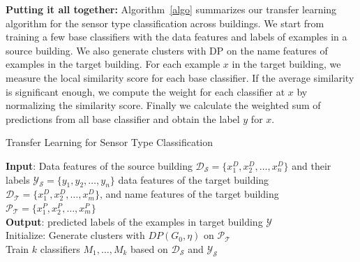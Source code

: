 {\bf Putting it all together:} Algorithm~\ref{algo} summarizes our transfer learning algorithm for the sensor type classification across buildings. We start from training a few base classifiers with the data features and labels of examples in a source building. We also generate clusters with DP on the name features of examples in the target building. For each example $x$ in the target building, we measure the local similarity score for each base classifier. If the average similarity is significant enough, we compute the weight for each classifier at $x$ by normalizing the similarity score. Finally we calculate the weighted sum of predictions from all base classifier and obtain the label $y$ for $x$.

\begin{algorithm}[ht]
 \caption{Transfer Learning for Sensor Type Classification}
 \label{algo}
 {\bf Input}: Data features of the source building $\mathcal{D_S}=\{x^D_1,x^D_2,\dots,x^D_n\}$ and their labels $\mathcal{Y_S}=\{y_1,y_2,\dots,y_n\}$  data features of the target building $\mathcal{D_T}=\{x^D_1,x^D_2,\dots,x^D_m\}$, and name features of the target building $\mathcal{P_T}=\{x^P_1,x^P_2,\dots,x^P_m\}$\\
 {\bf Output}: predicted labels of the examples in target building $\mathcal{Y}$\\
 Initialize: Generate clusters with $DP(G_{0}, \eta)$ on $\mathcal{P_T}$\\
 Train $k$ classifiers $M_1, \dots, M_k$ based on $\mathcal{D_S}$ and $\mathcal{Y_S}$\;

\end{algorithm}

